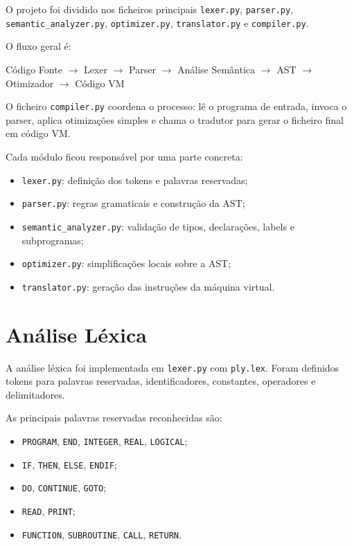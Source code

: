 \documentclass[11pt,a4paper]{article}
\begin{document}
O projeto foi dividido nos ficheiros principais \texttt{lexer.py}, \texttt{parser.py}, \texttt{semantic\_analyzer.py}, \texttt{optimizer.py}, \texttt{translator.py} e \texttt{compiler.py}.

O fluxo geral é:

\begin{center}
Código Fonte $\rightarrow$ Lexer $\rightarrow$ Parser $\rightarrow$ Análise Semântica $\rightarrow$ AST $\rightarrow$ Otimizador $\rightarrow$ Código VM
\end{center}

O ficheiro \texttt{compiler.py} coordena o processo: lê o programa de entrada, invoca o parser, aplica otimizações simples e chama o tradutor para gerar o ficheiro final em código VM.

Cada módulo ficou responsável por uma parte concreta:

\begin{itemize}
    \item \texttt{lexer.py}: definição dos tokens e palavras reservadas;
    \item \texttt{parser.py}: regras gramaticais e construção da AST;
    \item \texttt{semantic\_analyzer.py}: validação de tipos, declarações, labels e subprogramas;
    \item \texttt{optimizer.py}: simplificações locais sobre a AST;
    \item \texttt{translator.py}: geração das instruções da máquina virtual.
\end{itemize}

\section{Análise Léxica}

A análise léxica foi implementada em \texttt{lexer.py} com \texttt{ply.lex}. Foram definidos tokens para palavras reservadas, identificadores, constantes, operadores e delimitadores.

As principais palavras reservadas reconhecidas são:

\begin{itemize}
    \item \texttt{PROGRAM}, \texttt{END}, \texttt{INTEGER}, \texttt{REAL}, \texttt{LOGICAL};
    \item \texttt{IF}, \texttt{THEN}, \texttt{ELSE}, \texttt{ENDIF};
    \item \texttt{DO}, \texttt{CONTINUE}, \texttt{GOTO};
    \item \texttt{READ}, \texttt{PRINT};
    \item \texttt{FUNCTION}, \texttt{SUBROUTINE}, \texttt{CALL}, \texttt{RETURN}.
\end{itemize}
\end{document}
